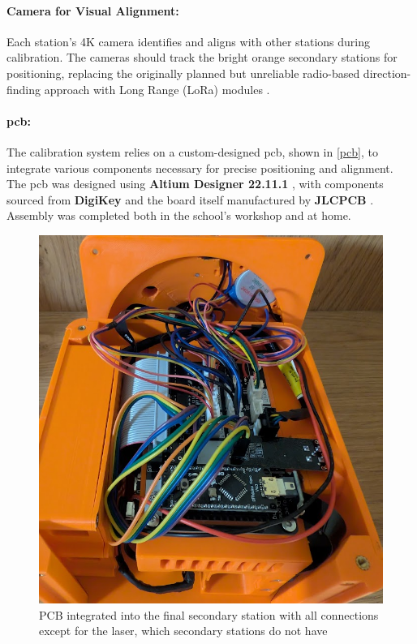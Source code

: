 \paragraph{Camera for Visual Alignment:}
Each station’s 4K camera \cite{armsom_camera_module} identifies and aligns with other stations during calibration. The cameras should track the bright orange secondary stations for positioning, replacing the originally planned but unreliable radio-based direction-finding approach with Long Range (LoRa) modules \cite{tecnoio_lora_modules}.


\paragraph{\acrshort{pcb}:}
The calibration system relies on a custom-designed \acrshort{pcb}, shown in \autoref{pcb}, to integrate various components necessary for precise positioning and alignment. The \acrshort{pcb} was designed using \textbf{Altium Designer 22.11.1} \cite{altium_designer_22}, with components sourced from \textbf{DigiKey} \cite{digikey} and the board itself manufactured by \textbf{JLCPCB} \cite{jlcpcb}. Assembly was completed both in the school’s workshop and at home.

\begin{figure}[H]
	\centering
	\includegraphics[width=1.0\linewidth]{figures/pcb}
	\caption{PCB integrated into the final secondary station with all connections except for the laser, which secondary stations do not have}
	\label{fig:pcb}
\end{figure}

